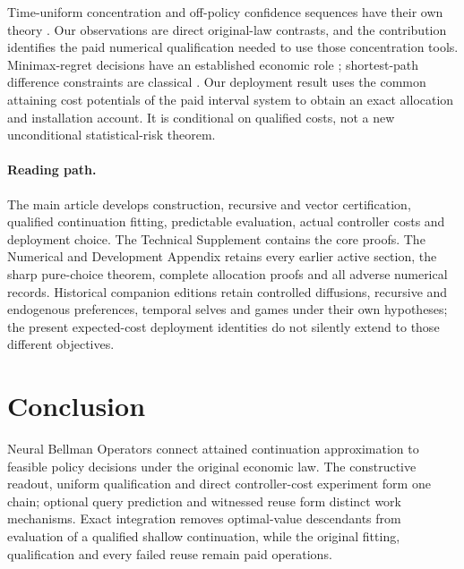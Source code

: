 \documentclass[ecta,nameyear,draft]{econsocart}
\begin{document}
Time-uniform concentration and off-policy confidence sequences have their own theory \citep{howard2020time,karampatziakis2021}. Our observations are direct original-law contrasts, and the contribution identifies the paid numerical qualification needed to use those concentration tools. Minimax-regret decisions have an established economic role \citep{manski2004}; shortest-path difference constraints are classical \citep{floyd1962}. Our deployment result uses the common attaining cost potentials of the paid interval system to obtain an exact allocation and installation account. It is conditional on qualified costs, not a new unconditional statistical-risk theorem.

\paragraph{Reading path.}
The main article develops construction, recursive and vector certification, qualified continuation fitting, predictable evaluation, actual controller costs and deployment choice. The Technical Supplement contains the core proofs. The Numerical and Development Appendix retains every earlier active section, the sharp pure-choice theorem, complete allocation proofs and all adverse numerical records. Historical companion editions retain controlled diffusions, recursive and endogenous preferences, temporal selves and games under their own hypotheses; the present expected-cost deployment identities do not silently extend to those different objectives.











\section{Conclusion}\label{sec:conclusion65}
Neural Bellman Operators connect attained continuation approximation to feasible policy decisions under the original economic law. The constructive readout, uniform qualification and direct controller-cost experiment form one chain; optional query prediction and witnessed reuse form distinct work mechanisms. Exact integration removes optimal-value descendants from evaluation of a qualified shallow continuation, while the original fitting, qualification and every failed reuse remain paid operations.
\end{document}
